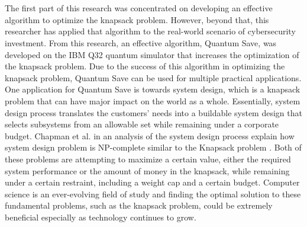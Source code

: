 \section*{\color{SectionBlue}{Conclusion}} \label{sec:sections}

The first part of this research was concentrated on  developing an effective algorithm to optimize the knapsack problem. However, beyond that, this researcher has applied that algorithm to the real-world scenario of cybersecurity investment. From this research, an effective algorithm, Quantum Save, was developed on the IBM Q32 quantum simulator that increases the optimization of the knapsack problem. Due to the success of this algorithm in optimizing the knapsack problem, Quantum Save can be used for multiple practical applications. One application for Quantum Save is towards system design, which is a knapsack problem that can have major impact on the world as a whole. Essentially, system design process translates the customers’ needs into a buildable system design that selects subsystems from an allowable set while remaining under a corporate budget. Chapman et al. \cite{chapman_system_2001} in an analysis of the system design process explain how system design problem is NP-complete similar to the Knapsack problem \cite{chapman_system_2001}. Both of these problems are attempting to maximize a certain value, either the required system performance or the amount of money in the knapsack, while remaining under a certain restraint, including a weight cap and a certain budget. Computer science is an ever-evolving field of study and finding the optimal solution to these fundamental problems, such as the knapsack problem, could be extremely beneficial especially as technology continues to grow. 

\vspace{1mm}

